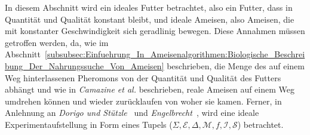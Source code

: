\documentclass[fontsize=12, a4aper]{scrartcl}
\begin{document}
	In diesem Abschnitt wird ein ideales Futter betrachtet, also ein Futter, dass in Quantität und Qualität konstant bleibt, und  ideale Ameisen, also Ameisen, die mit konstanter Geschwindigkeit sich geradlinig bewegen. Diese Annahmen müssen getroffen werden, da, wie im Abschnitt~\ref{subsubsec:Einfuehrung_In_Ameisenalgorithmen:Biologische_Beschreibung_Der_Nahrungssuche_Von_Ameisen} beschrieben, die Menge des auf einem Weg hinterlassenen Pheromons von der Quantität und Qualität des Futters abhängt und wie in \textit{Camazine et al.}\cite{camazineself} beschrieben, reale Ameisen auf einem Weg umdrehen können und wieder zurücklaufen von woher sie kamen. Ferner, in Anlehnung an \textit{Dorigo und Stützle}~\cite{dorigo2018ant} und \textit{Engelbrecht}~\cite{brecht2005fundamentals}, wird eine ideale Experimentaufstellung in Form eines Tupels (\(\Sigma, \mathcal{E}, \Delta, \mathcal{M}, f, \mathcal{I}, \mathcal{S}\)) betrachtet.\hfill\newline
	
\end{document}
